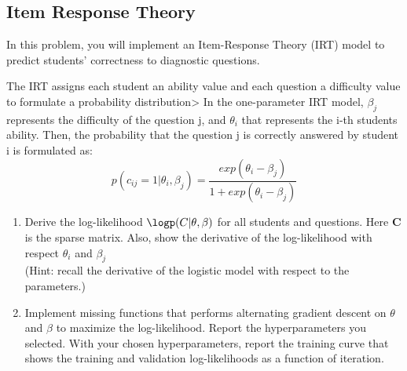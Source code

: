 \newpage
\subsection*{Item Response Theory}
In this problem, you will implement an Item-Response Theory (IRT) model to predict students' correctness to diagnostic questions.

The IRT assigns each student an ability value and each question a difficulty value to formulate a probability distribution> In the one-parameter IRT model, $\beta_j$ represents the difficulty of the question j, and $\theta_i$ that represents the i-th students ability. Then, the probability that the question j is correctly answered by student i is formulated as:
\begin{equation*}
	p(c_{ij} = 1 | \theta_{i}, \beta_{j}) = \frac{exp(\theta_i - \beta_j)}{1 + exp(\theta_i -\beta_j)}
\end{equation*}
\begin{enumerate}
	\item Derive the log-likelihood $\logp(C|\theta, \beta)$ for all students and questions. Here \textbf{C} is the sparse matrix. Also, show the derivative of the log-likelihood with respect $\theta_i$ and $\beta_j$\\(Hint: recall the derivative of the logistic model with respect to the parameters.) 
	\item Implement missing functions that performs alternating gradient descent on $\theta$ and $\beta$ to maximize the log-likelihood. Report the hyperparameters you selected. With your chosen hyperparameters, report the training curve that shows the training and validation log-likelihoods as a function of iteration.
	\end{enumerate}

